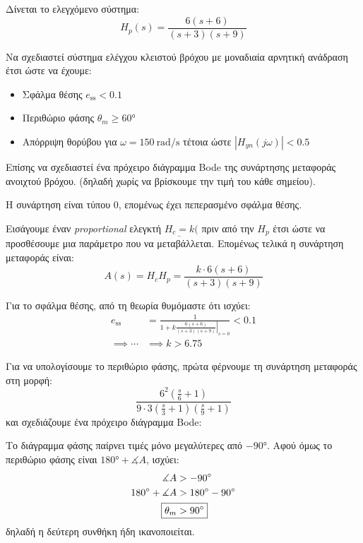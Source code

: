 \documentclass[11pt,a4paper,notitlepage,fleqn]{article}
\begin{document}
\begin{exercise}
Δίνεται το ελεγχόμενο σύστημα:
\[
H_p(s) = \frac{6(s+6)}{(s+3)(s+9)}
\]

Να σχεδιαστεί σύστημα ελέγχου κλειστού βρόχου με μοναδιαία αρνητική ανάδραση έτσι ώστε
να έχουμε:
\begin{itemize}
	\item Σφάλμα θέσης \( e_{\mathrm{ss}} < 0.1 \)
	\item Περιθώριο φάσης \( \theta_m \geq \ang{60} \)
	\item Απόρριψη θορύβου για \( \omega = \SI{150}{\radian/\second} \) τέτοια ώστε
	\( \left|H_{yn}(j\omega )\right| < 0.5 \)
\end{itemize}

Επίσης να σχεδιαστεί ένα πρόχειρο διάγραμμα Bode της συνάρτησης μεταφοράς ανοιχτού βρόχου.
(δηλαδή χωρίς να βρίσκουμε την τιμή του κάθε σημείου).

\tcblower
Η συνάρτηση είναι τύπου 0, επομένως έχει πεπερασμένο σφάλμα θέσης.

Εισάγουμε έναν \textit{proportional} ελεγκτή \( \underline{H_c = k} (\) πριν από
την \( H_p \) έτσι ώστε να προσθέσουμε μια παράμετρο που να μεταβάλλεται. Επομένως τελικά
η συνάρτηση μεταφοράς είναι:
\[
A(s) = H_cH_p = \frac{k\cdot 6(s+6)}{(s+3)(s+9)}
\]

Για το σφάλμα θέσης, από τη θεωρία θυμόμαστε ότι ισχύει:
\begin{align*}
	e_{\mathrm{ss}} &= \frac{1}{1+\left.k\frac{6(s+6)}{(s+3)(s+9)}\right|_{s=0}} < 0.1
	\\ \implies \cdots &\implies k > 6.75
\end{align*}

Για να υπολογίσουμε το περιθώριο φάσης, πρώτα φέρνουμε τη συνάρτηση μεταφοράς στη μορφή:
\[
\frac{6^2\left( \frac{s}{6} + 1 \right)}{9\cdot 3 \left( \frac{s}{3}+1 \right)\left(
	\frac{s}{9}+1
	\right)}
\]
και σχεδιάζουμε ένα πρόχειρο διάγραμμα Bode:

Το διάγραμμα φάσης παίρνει τιμές μόνο μεγαλύτερες από \( \ang{-90} \). Αφού όμως το
περιθώριο φάσης είναι \( \ang{180} + \measuredangle A \), ισχύει:
\begin{align*}
	\measuredangle A &> \ang{-90} \\
	\ang{180} + \measuredangle A &> \ang{180} - \ang{90} \\
	\Aboxed{\theta_m &> \ang{90}}
\end{align*}
δηλαδή η δεύτερη συνθήκη ήδη ικανοποιείται.


\end{exercise}
\end{document}
